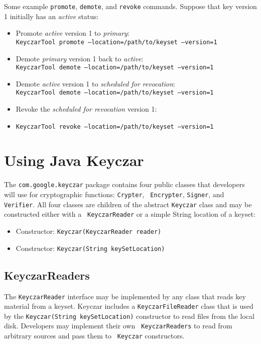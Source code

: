 \documentclass{llncs}
\begin{document}
Some example {\tt promote}, {\tt demote}, and {\tt revoke} commands. Suppose
that key version 1 initially has an {\it active} status:
\begin{itemize}
\item Promote {\it active} version 1 to {\it primary}: \\
{\tt KeyczarTool promote --location=/path/to/keyset --version=1}
\item Demote {\it primary} version 1 back to {\it active}: \\
{\tt KeyczarTool demote --location=/path/to/keyset --version=1}
\item Demote {\it active} version 1 to {\it scheduled for revocation}: \\
{\tt KeyczarTool demote --location=/path/to/keyset --version=1}
\item Revoke the {\it scheduled for revocation} version 1:  
\item {\tt KeyczarTool revoke --location=/path/to/keyset --version=1}
\end{itemize}

\section{Using Java Keyczar}

The {\tt com.google.keyczar} package contains four public classes that
developers will use for cryptographic functions: {\tt Crypter}, {\tt
Encrypter}, {\tt Signer}, and {\tt Verifier}. All four classes are children
of the abstract {\tt Keyczar} class and may be constructed either with a {\tt
KeyczarReader} or a simple String location of a keyset:
\begin{itemize}
  \item Constructor: {\tt Keyczar(KeyczarReader reader)}
  \item Constructor: {\tt Keyczar(String keySetLocation)}
\end{itemize} 

\subsection{KeyczarReaders}

The {\tt KeyczarReader} interface may be implemented by any class that reads
key material from a keyset. Keyczar includes a {\tt KeyczarFileReader} class
that is used by the {\tt Keyczar(String keySetLocation)} constructor to read
files from the local disk. Developers may implement their own {\tt
KeyczarReaders} to read from arbitrary sources and pass them to {\tt
Keyczar} constructors.
\end{document}
